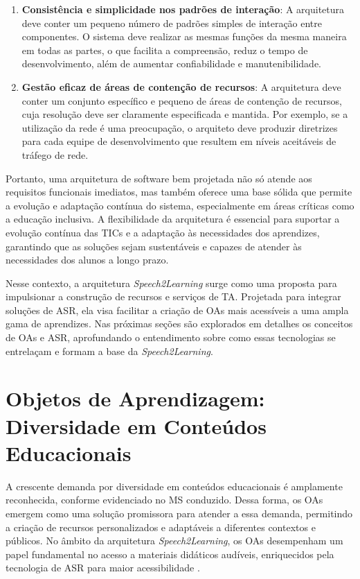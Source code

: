 \begin{enumerate}
    \item \textbf{Consistência e simplicidade nos padrões de interação}: A arquitetura deve conter um pequeno número de padrões simples de interação entre componentes. O sistema deve realizar as mesmas funções da mesma maneira em todas as partes, o que facilita a compreensão, reduz o tempo de desenvolvimento, além de aumentar confiabilidade e manutenibilidade.
    
    \item \textbf{Gestão eficaz de áreas de contenção de recursos}: A arquitetura deve conter um conjunto específico e pequeno de áreas de contenção de recursos, cuja resolução deve ser claramente especificada e mantida. Por exemplo, se a utilização da rede é uma preocupação, o arquiteto deve produzir diretrizes para cada equipe de desenvolvimento que resultem em níveis aceitáveis de tráfego de rede.
\end{enumerate}

Portanto, uma arquitetura de software bem projetada não só atende aos requisitos funcionais imediatos, mas também oferece uma base sólida que permite a evolução e adaptação contínua do sistema, especialmente em áreas críticas como a educação inclusiva. A flexibilidade da arquitetura é essencial para suportar a evolução contínua das TICs e a adaptação às necessidades dos aprendizes, garantindo que as soluções sejam sustentáveis e capazes de atender às necessidades dos alunos a longo prazo.

Nesse contexto, a arquitetura \textit{Speech2Learning} surge como uma proposta para impulsionar a construção de recursos e serviços de TA. Projetada para integrar soluções de ASR, ela visa facilitar a criação de OAs mais acessíveis a uma ampla gama de aprendizes. Nas próximas seções são explorados em detalhes os conceitos de OAs e ASR, aprofundando o entendimento sobre como essas tecnologias se entrelaçam e formam a base da \textit{Speech2Learning}.

\section{Objetos de Aprendizagem: Diversidade em Conteúdos Educacionais}
\label{section:foundation:lo}

A crescente demanda por diversidade em conteúdos educacionais é amplamente reconhecida, conforme evidenciado no MS conduzido. Dessa forma, os OAs emergem como uma solução promissora para atender a essa demanda, permitindo a criação de recursos personalizados e adaptáveis a diferentes contextos e públicos. No âmbito da arquitetura \textit{Speech2Learning}, os OAs desempenham um papel fundamental no acesso a materiais didáticos audíveis, enriquecidos pela tecnologia de ASR para maior acessibilidade \cite{FalvoJr2023_HICSS}.

